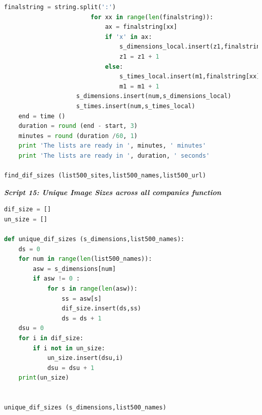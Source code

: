 \documentclass{book}
\begin{document}
\begin{lstlisting}[language=Python]
                        finalstring = string.split(':')                       
                        for xx in range(len(finalstring)):
                            ax = finalstring[xx]
                            if 'x' in ax:
                                s_dimensions_local.insert(z1,finalstring[xx])
                                z1 = z1 + 1
                            else:
                                s_times_local.insert(m1,finalstring[xx])
                                m1 = m1 + 1  
                    s_dimensions.insert(num,s_dimensions_local)
                    s_times.insert(num,s_times_local)                
    end = time ()
    duration = round (end - start, 3)
    minutes = round (duration /60, 1)
    print 'The lists are ready in ', minutes, ' minutes'
    print 'The lists are ready in ', duration, ' seconds'

find_dif_sizes (list500_sites,list500_names,list500_url)
\end{lstlisting} 

\begin{center}
\textit{\textbf{Script 15: Unique Image Sizes across all companies function}}\label{p15}
\end{center}
\begin{lstlisting}[language=Python]
dif_size = []  
un_size = [] 

def unique_dif_sizes (s_dimensions,list500_names):
    ds = 0
    for num in range(len(list500_names)):
        asw = s_dimensions[num]
        if asw != 0 :
            for s in range(len(asw)):
                ss = asw[s]
                dif_size.insert(ds,ss)
                ds = ds + 1    
    dsu = 0
    for i in dif_size:
        if i not in un_size:
            un_size.insert(dsu,i)
            dsu = dsu + 1
    print(un_size)          
 

unique_dif_sizes (s_dimensions,list500_names)
\end{lstlisting}
\end{document}

